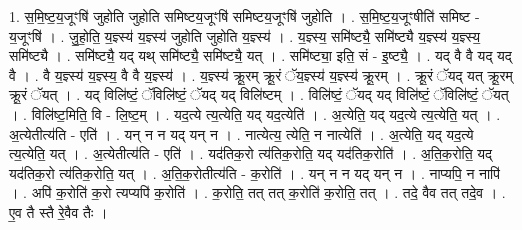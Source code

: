 \documentclass[17pt]{extarticle}
\begin{document}
1. स॒मि॒ष्ट॒य॒जूꣳषि॑ जुहोति जुहोति समिष्टय॒जूꣳषि॑ समिष्टय॒जूꣳषि॑ जुहोति । . स॒मि॒ष्ट॒य॒जूꣳषीति॑ समिष्ट - य॒जूꣳषि॑ । . जु॒हो॒ति॒ य॒ज्ञ्स्य॑ य॒ज्ञ्स्य॑ जुहोति जुहोति य॒ज्ञ्स्य॑ । . य॒ज्ञ्स्य॒ समि॑ष्ट्यै॒ समि॑ष्ट्यै य॒ज्ञ्स्य॑ य॒ज्ञ्स्य॒ समि॑ष्ट्यै । . समि॑ष्ट्यै॒ यद् यथ् समि॑ष्ट्यै॒ समि॑ष्ट्यै॒ यत् । . समि॑ष्ट्या॒ इति॒ सं - इ॒ष्ट्यै॒ । . यद् वै वै यद् यद् वै । . वै य॒ज्ञ्स्य॑ य॒ज्ञ्स्य॒ वै वै य॒ज्ञ्स्य॑ । . य॒ज्ञ्स्य॑ क्रू॒रम् क्रू॒रं ॅय॒ज्ञ्स्य॑ य॒ज्ञ्स्य॑ क्रू॒रम् । . क्रू॒रं ॅयद् यत् क्रू॒रम् क्रू॒रं ॅयत् । . यद् विलि॑ष्टं॒ ॅविलि॑ष्टं॒ ॅयद् यद् विलि॑ष्टम् । . विलि॑ष्टं॒ ॅयद् यद् विलि॑ष्टं॒ ॅविलि॑ष्टं॒ ॅयत् । . विलि॑ष्ट॒मिति॒ वि - लि॒ष्ट॒म् । . यद॒त्ये त्य॒त्येति॒ यद् यद॒त्येति॑ । . अ॒त्येति॒ यद् यद॒त्ये त्य॒त्येति॒ यत् । . अ॒त्येतीत्य॑ति - एति॑ । . यन् न न यद् यन् न । . नात्येत्य॒ त्येति॒ न नात्येति॑ । . अ॒त्येति॒ यद् यद॒त्ये त्य॒त्येति॒ यत् । . अ॒त्येतीत्य॑ति - एति॑ । . यद॑तिक॒रो त्य॑तिक॒रोति॒ यद् यद॑तिक॒रोति॑ । . अ॒ति॒क॒रोति॒ यद् यद॑तिक॒रो त्य॑तिक॒रोति॒ यत् । . अ॒ति॒क॒रोतीत्य॑ति - क॒रोति॑ । . यन् न न यद् यन् न । . नाप्यपि॒ न नापि॑ । . अपि॑ क॒रोति॑ क॒रो त्यप्यपि॑ क॒रोति॑ । . क॒रोति॒ तत् तत् क॒रोति॑ क॒रोति॒ तत् । . तदे॒ वैव तत् तदे॒व । . ए॒व तै स्तै रे॒वैव तैः । \newline
\end{document}

